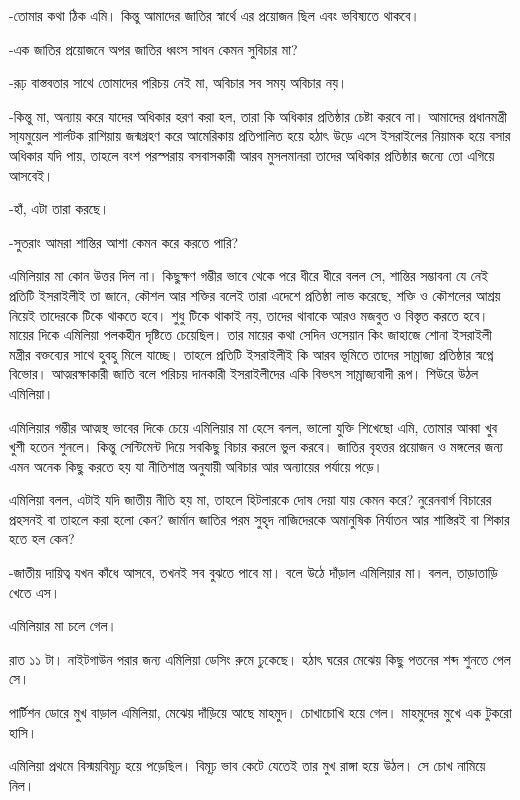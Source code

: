 \documentclass[
]{book}
\begin{document}
-তোমার কথা ঠিক এমি। কিন্তু আমাদের জাতির স্বার্থে এর প্রয়োজন ছিল এবং ভবিষ্যতে থাকবে।

-এক জাতির প্রয়োজনে অপর জাতির ধ্বংস সাধন কেমন সুবিচার মা?

-রূঢ় বাস্তবতার সাথে তোমাদের পরিচয় নেই মা, অবিচার সব সময় অবিচার নয়।

-কিন্তু মা, অন্যায় করে যাদের অধিকার হরণ করা হল, তারা কি অধিকার প্রতিষ্ঠার চেষ্টা করবে না। আমাদের প্রধানমন্ত্রী সা্যমুয়েল শার্লটক রাশিয়ায় জন্মগ্রহণ করে আমেরিকায় প্রতিপালিত হয়ে হঠাৎ উড়ে এসে ইসরাইলের নিয়ামক হয়ে বসার অধিকার যদি পায়, তাহলে বংশ পরস্পরায় বসবাসকারী আরব মুসলমানরা তাদের অধিকার প্রতিষ্ঠার জন্যে তো এগিয়ে আসবেই।

-হাঁ, এটা তারা করছে।

-সুতরাং আমরা শান্তির আশা কেমন করে করতে পারি?

এমিলিয়ার মা কোন উত্তর দিল না। কিছুক্ষণ গম্ভীর ভাবে থেকে পরে ধীরে ধীরে বলল সে, শান্তির সম্ভাবনা যে নেই প্রতিটি ইসরাইলীই তা জানে, কৌশল আর শক্তির বলেই তারা এদেশে প্রতিষ্ঠা লাভ করেছে, শক্তি ও কৌশলের আশ্রয় নিয়েই তাদেরকে টিকে থাকতে হবে। শুধু টিকে থাকাই নয়, তাদের থাবাকে আরও মজবুত ও বিস্তৃত করতে হবে। মায়ের দিকে এমিলিয়া পলকহীন দৃষ্টিতে চেয়েছিল। তার মায়ের কথা সেদিন ওসেয়ান কিং জাহাজে শোনা ইসরাইলী মন্ত্রীর বক্তব্যের সাথে হুবহু মিলে যাচ্ছে। তাহলে প্রতিটি ইসরাইলীই কি আরব ভূমিতে তাদের সাম্রাজ্য প্রতিষ্ঠার স্বপ্নে বিভোর। আত্মরক্ষাকারী জাতি বলে পরিচয় দানকারী ইসরাইলীদের একি বিভৎস সাম্রাজ্যবাদী রূপ। শিউরে উঠল এমিলিয়া।

এমিলিয়ার গম্ভীর আত্মস্থ ভাবের দিকে চেয়ে এমিলিয়ার মা হেসে বলল, ভালো যুক্তি শিখেছো এমি, তোমার আব্বা খুব খুশী হতেন শুনলে। কিন্তু সেন্টিমেন্ট দিয়ে সবকিছু বিচার করলে ভুল করবে। জাতির বৃহত্তর প্রয়োজন ও মঙ্গলের জন্য এমন অনেক কিছু করতে হয় যা নীতিশাস্ত্র অনুযায়ী অবিচার আর অন্যায়ের পর্যায়ে পড়ে।

এমিলিয়া বলল, এটাই যদি জাতীয় নীতি হয় মা, তাহলে হিটলারকে দোষ দেয়া যায় কেমন করে? নুরেনবার্গ বিচারের প্রহসনই বা তাহলে করা হলো কেন? জার্মান জাতির পরম সুহৃদ নাজিদেরকে অমানুষিক নির্যাতন আর শাস্তিরই বা শিকার হতে হল কেন?

-জাতীয় দায়িত্ব যখন কাঁধে আসবে, তখনই সব বুঝতে পাবে মা। বলে উঠে দাঁড়াল এমিলিয়ার মা। বলল, তাড়াতাড়ি খেতে এস।

এমিলিয়ার মা চলে গেল।

রাত ১১ টা। নাইটগাউন পরার জন্য এমিলিয়া ডেসিং রুমে ঢুকেছে। হঠাৎ ঘরের মেঝেয় কিছু পতনের শব্দ শুনতে পেল সে।

পার্টিশন ডোরে মুখ বাড়াল এমিলিয়া, মেঝেয় দাঁড়িয়ে আছে মাহমুদ। চোখাচোখি হয়ে গেল। মাহমুদের মুখে এক টুকরো হাসি।

এমিলিয়া প্রথমে বিস্ময়বিমূঢ় হয়ে পড়েছিল। বিমূঢ় ভাব কেটে যেতেই তার মুখ রাঙ্গা হয়ে উঠল। সে চোখ নামিয়ে নিল।
\end{document}
